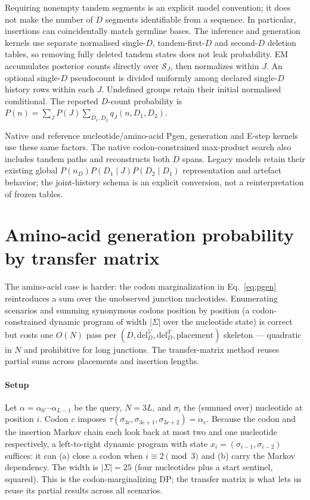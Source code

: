 \documentclass[11pt]{article}
\theoremstyle{oldplain}
\theoremstyle{oldrem}
\newcommand{\del}{\mathrm{del}}
\begin{document}
Requiring nonempty tandem segments is an explicit model convention; it does not
make the number of $D$ segments identifiable from a sequence. In particular,
insertions can coincidentally match germline bases. The inference and generation
kernels use separate normalised single-$D$, tandem-first-$D$ and second-$D$
deletion tables, so removing fully deleted tandem states does not leak probability.
EM accumulates posterior counts directly over $\mathcal S_J$, then normalizes within
$J$. An optional single-$D$ pseudocount is divided uniformly among declared
single-$D$ history rows within each $J$. Undefined groups retain their initial
normalised conditional. The reported $D$-count probability is
$P(n)=\sum_JP(J)\sum_{D_1,D_2}q_J(n,D_1,D_2)$.

Native and reference nucleotide/amino-acid Pgen, generation and E-step kernels
use these same factors. The native codon-constrained max-product search also
includes tandem paths and reconstructs both $D$ spans. Legacy models retain their
existing global $P(n_D)P(D_1\mid J)P(D_2\mid D_1)$ representation and artefact behavior;
the joint-history schema is an explicit conversion, not a reinterpretation of
frozen tables.

\section{Amino-acid generation probability by transfer matrix}\label{sec:aa}

The amino-acid case is harder: the codon marginalization in Eq.~\eqref{eq:pgen} reintroduces a sum over
the unobserved junction nucleotides. Enumerating scenarios and summing synonymous codons position by
position (a codon-constrained dynamic program of width $|\Sigma|$ over the nucleotide state) is correct
but costs one $O(N)$ pass per $(D,\del_D^{5'},\del_D^{3'},\text{placement})$ skeleton --- quadratic in
$N$ and prohibitive for long junctions. The transfer-matrix method reuses partial sums across placements and insertion lengths.

\paragraph{Setup} Let $\alpha=\alpha_0\cdots\alpha_{L-1}$ be the query, $N=3L$, and $\sigma_i$ the (summed
over) nucleotide at position $i$. Codon $c$ imposes
$\tau(\sigma_{3c},\sigma_{3c+1},\sigma_{3c+2})=\alpha_c$. Because the codon and the insertion Markov chain
each look back at most two and one nucleotide respectively, a left-to-right dynamic program with state
$x_i=(\sigma_{i-1},\sigma_{i-2})$ suffices: it can (a) close a codon when $i\equiv 2\pmod 3$ and (b) carry
the Markov dependency. The width is $|\Sigma|=25$ (four nucleotides plus a start sentinel, squared). This
is the codon-marginalizing DP; the transfer matrix is what lets us reuse its partial results across all
scenarios.
\end{document}
